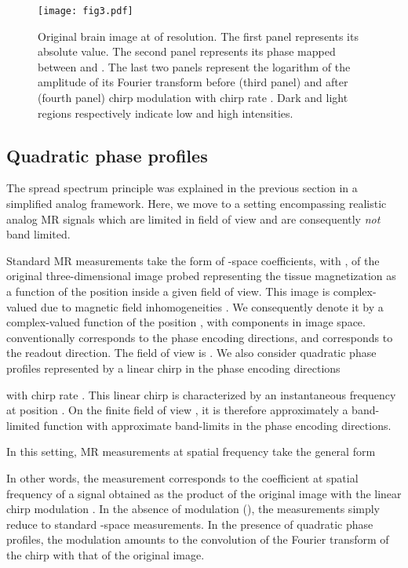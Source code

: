 \documentclass[10pt,draftcls, onecolumn]{IEEEtran}
\begin{document}
\begin{figure}
\centering
\texttt{[image: fig3.pdf]}
\caption{\label{fig:original image}Original brain image at  of resolution. The first panel represents its absolute value. The second panel represents its phase mapped between  and . The last two panels represent the logarithm of the amplitude of its Fourier transform before (third panel) and after (fourth panel) chirp modulation with chirp rate . Dark and light regions respectively indicate low and high intensities.}
\end{figure}


\subsection{Quadratic phase profiles}
\label{sub:Quadratic phase profiles}

The spread spectrum principle was explained in the previous section in a simplified analog framework. Here, we move to a setting encompassing realistic analog MR signals which are limited in field of view and are consequently \emph{not} band limited.

Standard MR measurements take the form of  -space coefficients, with , of the original three-dimensional image probed representing the tissue magnetization as a function of the position inside a given field of view. This image is complex-valued due to magnetic field inhomogeneities \cite{haake99}. We consequently denote it by a complex-valued function  of the position , with components  in image space.  conventionally corresponds to the phase encoding directions, and  corresponds to the readout direction. The field of view is . We also consider quadratic phase profiles represented by a linear chirp in the phase encoding directions

with chirp rate . This linear chirp is characterized by an instantaneous frequency  at position . On the finite field of view , it is therefore approximately a band-limited function with approximate band-limits  in the phase encoding directions.

In this setting, MR measurements at spatial frequency  take the general form

In other words, the measurement  corresponds to the coefficient at spatial frequency  of a signal obtained as the product of the original image  with the linear chirp modulation . In the absence of modulation (), the measurements simply reduce to standard -space measurements. In the presence of quadratic phase profiles, the modulation amounts to the convolution of the Fourier transform of the chirp with that of the original image.
\end{document}
